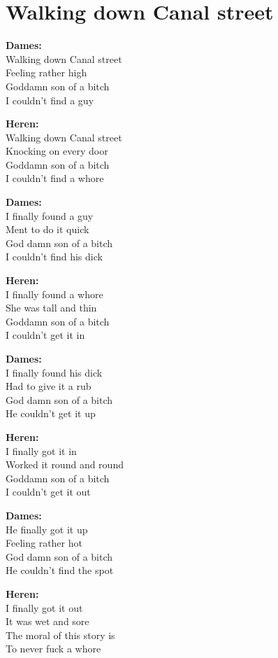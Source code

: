 \section{Walking down Canal street}
\textbf{Dames:}\\
Walking down Canal street\\
Feeling rather high\\
Goddamn son of a bitch\\
I couldn’t find a guy

\textbf{Heren:}\\
Walking down Canal street\\
Knocking on every door\\
Goddamn son of a bitch\\
I couldn't find a whore

\textbf{Dames:}\\
I finally found a guy\\ 
Ment to do it quick\\
God damn son of a bitch\\
I couldn’t find his dick

\textbf{Heren:}\\
I finally found a whore\\
She was tall and thin\\
Goddamn son of a bitch\\
I couldn't get it in

\textbf{Dames:}\\
I finally found his dick\\
Had to give it a rub\\
God damn son of a bitch\\
He couldn’t get it up

\textbf{Heren:}\\
I finally got it in\\
Worked it round and round\\
Goddamn son of a bitch\\
I couldn't get it out

\textbf{Dames:}\\
He finally got it up\\
Feeling rather hot\\
God damn son of a bitch\\
He couldn’t find the spot

\textbf{Heren:}\\
I finally got it out\\
It was wet and sore\\
The moral of this story is\\
To never fuck a whore

